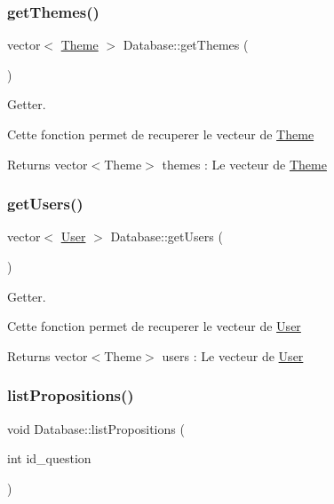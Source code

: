 \subsubsection{\texorpdfstring{get\+Themes()}{getThemes()}}
{\footnotesize\ttfamily vector$<$ \mbox{\hyperlink{classTheme}{Theme}} $>$ Database\+::get\+Themes (\begin{DoxyParamCaption}{ }\end{DoxyParamCaption})}



Getter. 

Cette fonction permet de recuperer le vecteur de \mbox{\hyperlink{classTheme}{Theme}} \begin{DoxyReturn}{Returns}
vector$<$\+Theme$>$ themes \+: Le vecteur de \mbox{\hyperlink{classTheme}{Theme}} 
\end{DoxyReturn}
\mbox{\label{classDatabase_a78d088be3546d65b81e532d931a90f22}} 
\subsubsection{\texorpdfstring{get\+Users()}{getUsers()}}
{\footnotesize\ttfamily vector$<$ \mbox{\hyperlink{classUser}{User}} $>$ Database\+::get\+Users (\begin{DoxyParamCaption}{ }\end{DoxyParamCaption})}



Getter. 

Cette fonction permet de recuperer le vecteur de \mbox{\hyperlink{classUser}{User}} \begin{DoxyReturn}{Returns}
vector$<$\+Theme$>$ users \+: Le vecteur de \mbox{\hyperlink{classUser}{User}} 
\end{DoxyReturn}
\mbox{\label{classDatabase_a184cd88b6dfcc3938b699107b693d642}} 
\subsubsection{\texorpdfstring{list\+Propositions()}{listPropositions()}}
{\footnotesize\ttfamily void Database\+::list\+Propositions (\begin{DoxyParamCaption}\item[{int}]{id\+\_\+question }\end{DoxyParamCaption})}



